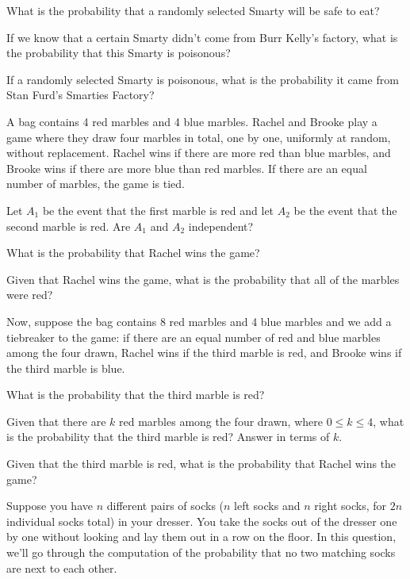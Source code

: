 \documentclass[11pt]{article}
\begin{document}
\begin{Parts}
\Part
What is the probability that a randomly selected Smarty will be safe to eat?

\Part
If we know that a certain Smarty didn't come from Burr Kelly's factory, what is the probability that this Smarty is poisonous?

\Part
If a randomly selected Smarty is poisonous, what is the probability it came from Stan Furd's Smarties Factory?

\end{Parts}


A bag contains 4 red marbles and 4 blue marbles. Rachel and Brooke play a game where they draw four marbles in total, one by one, uniformly at random, without replacement. Rachel wins if there are more red than blue marbles, and Brooke wins if there are more blue than red marbles. If there are an equal number of marbles, the game is tied.
\begin{Parts}
    \Part Let $A_1$ be the event that the first marble is red and let $A_2$ be the event that the second marble is red. Are $A_1$ and $A_2$ independent?
    
    \Part What is the probability that Rachel wins the game?
    
    \Part Given that Rachel wins the game, what is the probability that all of the marbles were red?
\end{Parts}
Now, suppose the bag contains 8 red marbles and 4 blue marbles and we add a tiebreaker to the game: if there are an equal number of red and blue marbles among the four drawn, Rachel wins if the third marble is red, and Brooke wins if the third marble is blue. 
\begin{Parts}[resume]
    \Part What is the probability that the third marble is red?
    
    \Part Given that there are $k$ red marbles among the four drawn, where $0 \leq k \leq 4$, what is the probability that the third marble is red? Answer in terms of $k$.
    
    \Part Given that the third marble is red, what is the probability that Rachel wins the game?
    
\end{Parts}

Suppose you have $n$ different pairs of socks ($n$ left socks and $n$ right socks, for $2n$ individual socks total) in your dresser. 
You take the socks out of the dresser one by one without looking and lay them out in a row on the floor. 
In this question, we'll go through the computation of the probability that no two matching socks are next to each other.
\end{document}
